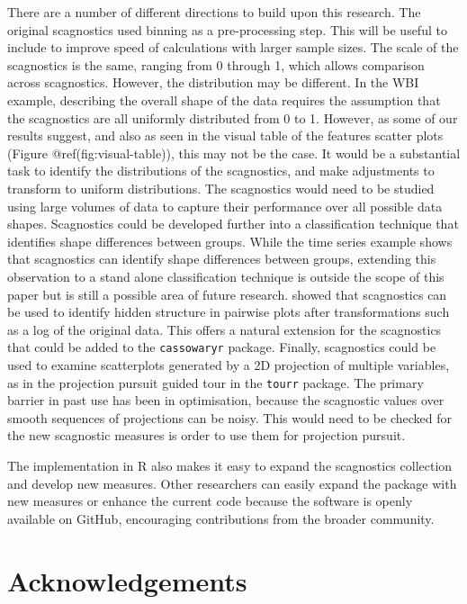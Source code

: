 There are a number of different directions to build upon this research.
The original scagnostics used binning as a pre-processing step. This
will be useful to include to improve speed of calculations with larger
sample sizes. The scale of the scagnostics is the same, ranging from 0
through 1, which allows comparison across scagnostics. However, the
distribution may be different. In the WBI example, describing the
overall shape of the data requires the assumption that the scagnostics
are all uniformly distributed from 0 to 1. However, as some of our
results suggest, and also as seen in the visual table of the features
scatter plots (Figure @ref(fig:visual-table)), this may not be the case.
It would be a substantial task to identify the distributions of the
scagnostics, and make adjustments to transform to uniform distributions.
The scagnostics would need to be studied using large volumes of data to
capture their performance over all possible data shapes. Scagnostics
could be developed further into a classification technique that
identifies shape differences between groups. While the time series
example shows that scagnostics can identify shape differences between
groups, extending this observation to a stand alone classification
technique is outside the scope of this paper but is still a possible
area of future research. \citet{hidscags} showed that scagnostics can be
used to identify hidden structure in pairwise plots after
transformations such as a log of the original data. This offers a
natural extension for the scagnostics that could be added to the
\texttt{cassowaryr} package. Finally, scagnostics could be used to
examine scatterplots generated by a 2D projection of multiple variables,
as in the projection pursuit guided tour in the \texttt{tourr} package.
The primary barrier in past use has been in optimisation, because the
scagnostic values over smooth sequences of projections can be noisy.
This would need to be checked for the new scagnostic measures is order
to use them for projection pursuit.

The implementation in R also makes it easy to expand the scagnostics
collection and develop new measures. Other researchers can easily expand
the package with new measures or enhance the current code because the
software is openly available on GitHub, encouraging contributions from
the broader community.

\hypertarget{acknowledgements}{%
\section{Acknowledgements}\label{acknowledgements}}

